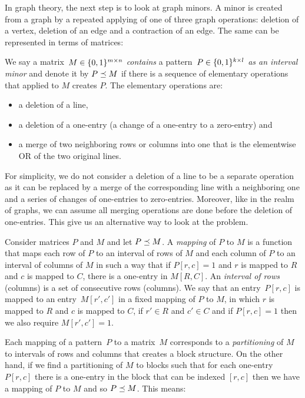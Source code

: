 In graph theory, the next step is to look at graph minors. A minor is created from a graph by a repeated applying of one of three graph operations: deletion of a vertex, deletion of an edge and a contraction of an edge. The same can be represented in terms of matrices:

\begin{defn}
We say a matrix~$M\in\{0,1\}^{m\times n}$ \emph{contains} a pattern~$P\in\{0,1\}^{k\times l}$ \emph{as an interval minor} and denote it by $P\preceq M$ if there is a sequence of elementary operations that applied to $M$ creates $P$. The elementary operations are:
\begin{itemize}
	\item a deletion of a line,
	\item a deletion of a one-entry (a change of a one-entry to a zero-entry) and
	\item a merge of two neighboring rows or columns into one that is the elementwise OR of the two original lines. 
\end{itemize}
\end{defn}

For simplicity, we do not consider a deletion of a line to be a separate operation as it can be replaced by a merge of the corresponding line with a neighboring one and a series of changes of one-entries to zero-entries. Moreover, like in the realm of graphs, we can assume all merging operations are done before the deletion of one-entries. This give us an alternative way to look at the problem.

\begin{defn}
Consider matrices $P$ and $M$ and let $P\preceq M$. A \emph{mapping} of $P$ to $M$ is a function that maps each row of $P$ to an interval of rows of $M$ and each column of $P$ to an interval of columns of $M$ in such a way that if $P[r,c]=1$ and $r$ is mapped to $R$ and $c$ is mapped to $C$, there is a one-entry in $M[R,C]$. An \emph{interval of rows} (columns) is a set of consecutive rows (columns). We say that an entry~$P[r,c]$ is mapped to an entry~$M[r',c']$ in a fixed mapping of $P$ to $M$, in which $r$ is mapped to $R$ and $c$ is mapped to $C$, if $r'\in R$ and $c'\in C$ and if $P[r,c]=1$ then we also require $M[r',c']=1$.
\end{defn}

Each mapping of a pattern~$P$ to a matrix~$M$ corresponds to a \emph{partitioning} of $M$ to intervals of rows and columns that creates a block structure. On the other hand, if we find a partitioning of $M$ to blocks such that for each one-entry $P[r,c]$ there is a one-entry in the block that can be indexed $[r,c]$ then we have a mapping of $P$ to $M$ and so $P\preceq M$. This means:

